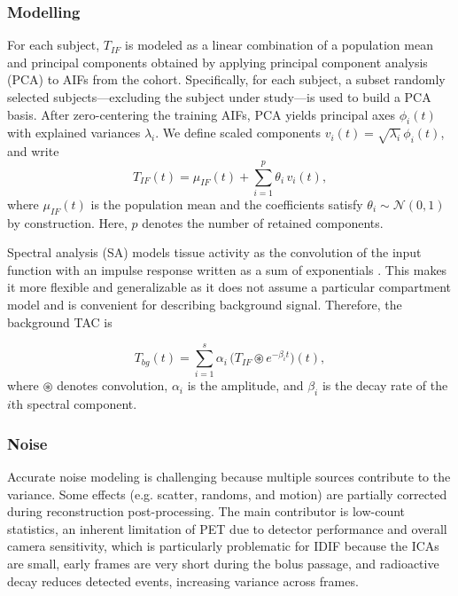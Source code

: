 \subsubsection{Modelling}
For each subject, \(T_{IF}\) is modeled as a linear combination of a population mean and principal components obtained by applying principal component analysis (PCA) to AIFs from the cohort.
Specifically, for each subject, a subset randomly selected subjects—excluding the subject under study—is used to build a PCA basis.
After zero-centering the training AIFs, PCA yields principal axes \(\phi_i(t)\) with explained variances \(\lambda_i\).
We define scaled components \(v_i(t) = \sqrt{\lambda_i}\,\phi_i(t)\), and write
\begin{equation}
	T_{IF}(t) = \mu_{IF}(t) + \sum_{i=1}^p \theta_i\,v_i(t),
\end{equation}
where \(\mu_{IF}(t)\) is the population mean and the coefficients satisfy \(\theta_i \sim \mathcal{N}(0,1)\) by construction.
Here, \(p\) denotes the number of retained components.

Spectral analysis (SA) models tissue activity as the convolution of the input function with an impulse response written as a sum of exponentials \cite{cunningham1993spectral}.
This makes it more flexible and generalizable as it does not assume a particular compartment model and is convenient for describing background signal.
Therefore, the background TAC is

\begin{equation}
	T_{bg}(t) = \sum_{i=1}^s \alpha_{i} \,\bigl(T_{IF} \circledast e^{-\beta_{i} t}\bigr)(t),
\end{equation}
where \(\circledast\) denotes convolution, \(\alpha_i\) is the amplitude, and \(\beta_i\) is the decay rate of the \(i\)th spectral component.

\subsubsection{Noise}
Accurate noise modeling is challenging because multiple sources contribute to the variance.
Some effects (e.g. scatter, randoms, and motion) are partially corrected during reconstruction post-processing.
The main contributor is low-count statistics, an inherent limitation of PET due to detector performance and overall camera sensitivity, which is particularly problematic for IDIF because the ICAs are small, early frames are very short during the bolus passage, and radioactive decay reduces detected events, increasing variance across frames.

